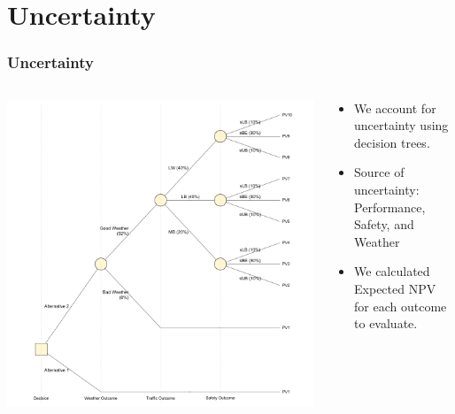 \documentclass{beamer}
\begin{document}
\section{Uncertainty}
\begin{frame}
  \frametitle{Uncertainty}
  \begin{columns}
    \begin{column}{0.7\textwidth}
      \centering
      \includegraphics[width=\textwidth]{../../R/decisiontree}
    \end{column}
    \begin{column}{0.4\textwidth}
      \begin{itemize}\small
      \item We account for uncertainty using decision trees.
      \item Source of uncertainty: Performance, Safety, and Weather
      \item We calculated Expected NPV for each outcome to evaluate.
      \end{itemize}
    \end{column}
  \end{columns}
\end{frame}
\end{document}
